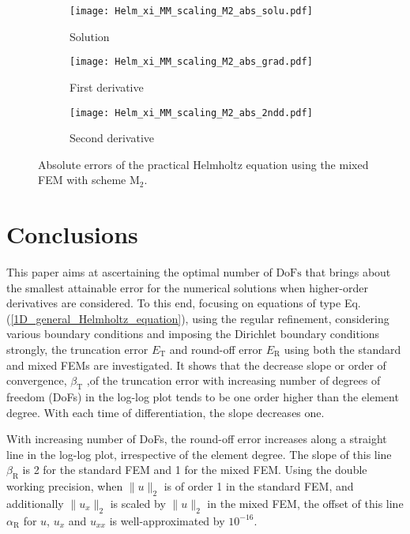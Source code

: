 \documentclass[final,3p]{elsarticle}
\begin{document}
\begin{figure}[!ht]
    \begin{subfigure}{5.5cm}
        \texttt{[image: Helm\_xi\_MM\_scaling\_M2\_abs\_solu.pdf]}
        \caption{Solution}
        \label{Fig:Helm_xi_MM_scaling_M2_abs_solu}
    \end{subfigure}
    \begin{subfigure}{5.5cm}
        \texttt{[image: Helm\_xi\_MM\_scaling\_M2\_abs\_grad.pdf]}
        \caption{First derivative}
        \label{Fig:Helm_xi_MM_scaling_M2_abs_grad}
    \end{subfigure}
    \begin{subfigure}{5.5cm}
        \texttt{[image: Helm\_xi\_MM\_scaling\_M2\_abs\_2ndd.pdf]}
        \caption{Second derivative}
        \label{Fig:Helm_xi_MM_scaling_M2_abs_2ndd}
    \end{subfigure}    
\caption{Absolute errors of the practical Helmholtz equation using the mixed FEM with scheme $\text{M}_2$.}
\label{Fig:Helm_xi_MM_scaling_M2_abs}
\end{figure}

\section{Conclusions}		\label{paragraph on conclusion}

This paper aims at ascertaining the optimal number of $\text{DoFs}$ that brings about the smallest attainable error for the numerical solutions when higher-order derivatives are considered.
To this end, focusing on equations of type Eq. (\ref{1D_general_Helmholtz_equation}), using the regular refinement, considering various boundary conditions and imposing the Dirichlet boundary conditions strongly, the truncation error ${E}_{\text{T}}$ and round-off error ${E}_{\text{R}}$ using both the standard and mixed FEMs are investigated. It shows that the decrease slope or order of convergence, $\beta _{\text{T}}$ ,of the truncation error with increasing number of degrees of freedom (DoFs) in the log-log plot tends to be one order higher than the element degree. With each time of differentiation, the slope decreases one.

With increasing number of DoFs, the round-off error increases along a straight line in the log-log plot, irrespective of the element degree. The slope of this line $\beta _{\text{R}}$ is 2 for the standard FEM and 1 for the mixed FEM.
Using the double working precision, when $\|u\|_2$ is of order 1 in the standard FEM, and additionally $\|u_x\|_2$ is scaled by $\|u\|_2$ in the mixed FEM, the offset of this line $\alpha_{\text{R}}$ for $u$, $u_{x}$ and $u_{xx}$ is well-approximated by $10^{-16}$.
\end{document}
